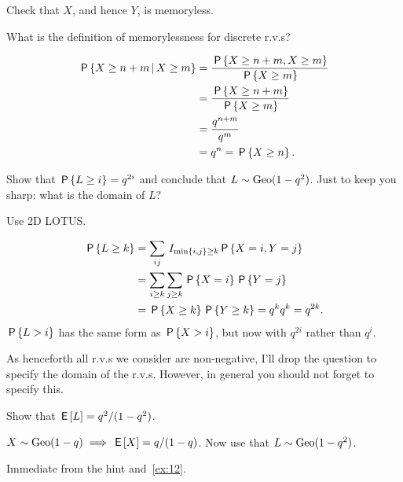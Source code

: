 \documentclass[a4paper,11pt]{article}
\begin{document}
\begin{exercise}
Check that $X$, and hence $Y$, is memoryless.
\begin{hint}
What is the definition of memorylessness for discrete r.v.s?  
\end{hint}
\begin{solution}
  \begin{align}
    \label{eq:13}
\P{X\geq n+m\given X\geq m} 
&= \frac{ \P{X\geq n+m,  X\geq m}}{\P{X\geq m}} \\
&= \frac{ \P{X\geq n+m}}{\P{X\geq m}} \\
&= \frac{ q^{n+m}}{q^m} \\
&= q^n= \P{X\geq n}.
  \end{align}
\end{solution}
\end{exercise}

\begin{exercise}\label{ex:12}
Show that $\P{L\geq i}=q^{2i}$ and conclude that $L\sim\Geo{1-q^{2}}$. Just to keep you sharp: what is the domain of $L$?
\begin{hint}
  Use 2D LOTUS.
\end{hint}
\begin{solution}
  \begin{align}
    \label{eq:12}
\P{L\geq k} 
&= \sum_{ij} \1{\min{i,j}\geq k} \P{X=i, Y=j}\\
&= \sum_{i\geq k} \sum_{j\geq k} \P{X=i}\P{Y=j}\\
&=  \P{X\geq k}\P{Y\geq k} = q^{k} q^{k} = q^{2k}.
  \end{align}
$\P{L>i}$ has the same form as $\P{X>i}$, but now with $q^{2i}$ rather than $q^{i}$.
\end{solution}
\end{exercise}

As henceforth all r.v.s we consider are non-negative, I'll drop the question to specify the domain of the r.v.s. However, in general you should not forget to specify this. 



\begin{exercise}\label{ex:3}
Show that  $\E L=q^{2}/(1-q^{2})$.
\begin{hint}
$X\sim \Geo{1-q} \implies \E X = q/(1-q)$. Now use that $L\sim\Geo{1-q^{2}}$. 
\end{hint}
\begin{solution}
  Immediate from the hint and~\cref{ex:12}. 
\end{solution}
\end{exercise}
\end{document}
